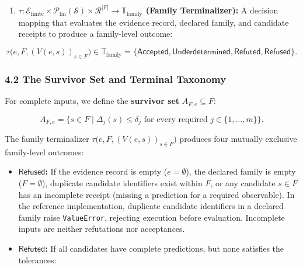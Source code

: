 \documentclass[
  10pt,
]{article}
\providecommand{\tightlist}{%
  \setlength{\itemsep}{0pt}\setlength{\parskip}{0pt}}
\providecommand{\tightlist}{%
  \setlength{\itemsep}{0pt}\setlength{\parskip}{0pt}}
\begin{document}
\begin{enumerate}
\def\labelenumi{\arabic{enumi}.}
\setcounter{enumi}{3}
\tightlist
\item
  \textbf{\hypertarget{math-E0156-0209}{}{\(\tau: \mathcal{E}_{\text{finite}} \times \mathcal{P}_{\text{fin}}(\mathcal{S}) \times \mathcal{R}^{|F|} \to \mathbb{T}_{\text{family}}\)} (Family Terminalizer):} A decision mapping that evaluates the evidence record, declared family, and candidate receipts to produce a family-level outcome:
\end{enumerate}

\hypertarget{math-E0157-0210}{}{\[\tau\bigl(e, F, (V(e, s))_{s \in F}\bigr) \in \mathbb{T}_{\text{family}} = \{\mathsf{Accepted}, \mathsf{Underdetermined}, \mathsf{Refuted}, \mathsf{Refused}\}.\]}

\subsubsection{4.2 The Survivor Set and Terminal Taxonomy}\label{the-survivor-set-and-terminal-taxonomy}

For complete inputs, we define the \textbf{survivor set} \hypertarget{math-E0158-0211}{}{\(A_{F,e} \subseteq F\)}:

\hypertarget{math-E0159-0212}{}{\[A_{F,e} = \{s \in F \mid \Delta_j(s) \le \delta_j \text{ for every required } j \in \{1, \ldots, m\}\}.\]}

The family terminalizer \hypertarget{math-E0160-0213}{}{\(\tau\bigl(e, F, (V(e,s))_{s\in F}\bigr)\)} produces four mutually exclusive family-level outcomes:

\begin{itemize}
\item
  \textbf{\hypertarget{math-E0151-0214}{}{\(\mathsf{Refused}\)}:} If the evidence record is empty (\hypertarget{math-E0161-0215}{}{\(e = \emptyset\)}), the declared family is empty (\hypertarget{math-E0162-0216}{}{\(F = \emptyset\)}), duplicate candidate identifiers exist within \hypertarget{math-E0005-0217}{}{\(F\)}, or any candidate \hypertarget{math-E0144-0218}{}{\(s \in F\)} has an incomplete receipt (missing a prediction for a required observable). In the reference implementation, duplicate candidate identifiers in a declared family raise \texttt{ValueError}, rejecting execution before evaluation. Incomplete inputs are neither refutations nor acceptances.
\item
  \textbf{\hypertarget{math-E0152-0219}{}{\(\mathsf{Refuted}\)}:} If all candidates have complete predictions, but none satisfies the tolerances:
\end{itemize}
\end{document}
